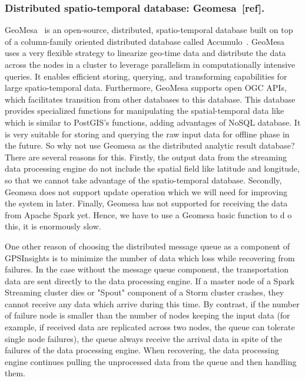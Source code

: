 \documentclass{acm_proc_article-sp}
\begin{document}
\subsubsection{Distributed spatio-temporal database: Geomesa~[ref].}
 GeoMesa~\cite{fox2013spatio} is an open-source, distributed, spatio-temporal database  built on top of a column-family oriented distributed database called Accumulo~\cite{accumuloonline}. GeoMesa uses a very flexible strategy to linearize geo-time data and distribute the data across the nodes in a cluster to leverage parallelism in computationally intensive queries. It enables efficient storing, querying, and transforming capabilities for large spatio-temporal data. Furthermore, GeoMesa supports open OGC APIs, which facilitates transition from other databases to this database. This database provides specialized functions for manipulating the spatial-temporal data like which is similar to PostGIS's functions, adding advantages of NoSQL database. It is very suitable for storing and querying the raw input data for offline phase in the future. So why not use Geomesa as the distributed analytic result database? There are several reasons for this. Firstly, the output data from the streaming data processing engine do not include the spatial field like latitude and longitude, so that we cannot take advantage of the spatio-temporal database. Secondly, Geomesa does not support update operation which we will need for improving the system in later.  Finally, Geomesa has not supported for receiving the data from Apache Spark yet. Hence, we have to use a Geomesa basic function to d
o this, it is enormously slow.


One other reason of choosing the distributed message queue as a component of GPSInsights is to minimize the number of data which loss while recovering from failures. In the case without the message queue component, the transportation data are sent directly to the data processing engine. If a master node of a Spark Streaming cluster dies or "Spout" component of a Storm cluster crashes, they cannot receive any data which arrive during this time. By contrast, if the number of failure node is smaller than the number of nodes keeping the input data (for example, if received data are replicated across two nodes, the queue can tolerate single node failures), the queue always receive the arrival data in spite of the failures of the data processing engine. When recovering, the data processing engine continues pulling the unprocessed data from the queue and then handling them.
\end{document}
